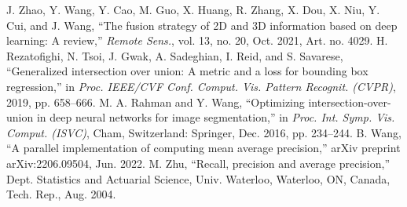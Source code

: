 \begin{thebibliography}{00}
 J. Zhao, Y. Wang, Y. Cao, M. Guo, X. Huang, R. Zhang, X. Dou, X. Niu, Y. Cui, and J. Wang, ``The fusion strategy of 2D and 3D information based on deep learning: A review,'' {\it Remote Sens.}, vol. 13, no. 20, Oct. 2021, Art. no. 4029.
 H. Rezatofighi, N. Tsoi, J. Gwak, A. Sadeghian, I. Reid, and S. Savarese, ``Generalized intersection over union: A metric and a loss for bounding box regression,'' in {\it Proc. IEEE/CVF Conf. Comput. Vis. Pattern Recognit. (CVPR)}, 2019, pp. 658--666.
 M. A. Rahman and Y. Wang, ``Optimizing intersection-over-union in deep neural networks for image segmentation,'' in {\it Proc. Int. Symp. Vis. Comput. (ISVC)}, Cham, Switzerland: Springer, Dec. 2016, pp. 234--244.
 B. Wang, ``A parallel implementation of computing mean average precision,'' arXiv preprint arXiv:2206.09504, Jun. 2022.
 M. Zhu, ``Recall, precision and average precision,'' Dept. Statistics and Actuarial Science, Univ. Waterloo, Waterloo, ON, Canada, Tech. Rep., Aug. 2004.

\end{thebibliography}